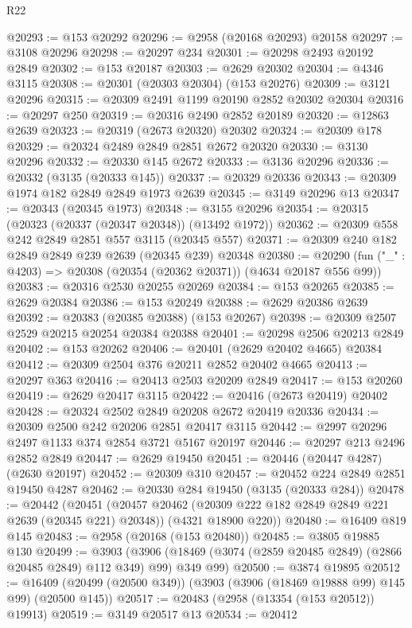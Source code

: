 \begin{lexlean}{R22}
\begin{coremodule}
@20293 := @153 @20292
@20296 := @2958 (@20168 @20293) @20158
@20297 := @3108 @20296
@20298 := @20297 @234
@20301 := @20298 @2493 @20192 @2849
@20302 := @153 @20187
@20303 := @2629 @20302
@20304 := @4346 @3115
@20308 := @20301 (@20303 @20304) (@153 @20276)
@20309 := @3121 @20296
@20315 := @20309 @2491 @1199 @20190 @2852 @20302 @20304
@20316 := @20297 @250
@20319 := @20316 @2490 @2852 @20189
@20320 := @12863 @2639
@20323 := @20319 (@2673 @20320) @20302
@20324 := @20309 @178
@20329 := @20324 @2489 @2849 @2851 @2672 @20320
@20330 := @3130 @20296
@20332 := @20330 @145 @2672
@20333 := @3136 @20296
@20336 := @20332 (@3135 (@20333 @145))
@20337 := @20329 @20336
@20343 := @20309 @1974 @182 @2849 @2849 @1973 @2639
@20345 := @3149 @20296 @13
@20347 := @20343 (@20345 @1973)
@20348 := @3155 @20296
@20354 := @20315 (@20323 (@20337 (@20347 @20348)) (@13492 @1972))
@20362 := @20309 @558 @242 @2849 @2851 @557 @3115 (@20345 @557)
@20371 := @20309 @240 @182 @2849 @2849 @239 @2639 (@20345 @239) @20348
@20380 := @20290 (fun ("_" : @4203) => @20308 (@20354 (@20362 @20371)) (@4634 @20187 @556 @99))
@20383 := @20316 @2530 @20255 @20269
@20384 := @153 @20265
@20385 := @2629 @20384
@20386 := @153 @20249
@20388 := @2629 @20386 @2639
@20392 := @20383 (@20385 @20388) (@153 @20267)
@20398 := @20309 @2507 @2529 @20215 @20254 @20384 @20388
@20401 := @20298 @2506 @20213 @2849
@20402 := @153 @20262
@20406 := @20401 (@2629 @20402 @4665) @20384
@20412 := @20309 @2504 @376 @20211 @2852 @20402 @4665
@20413 := @20297 @363
@20416 := @20413 @2503 @20209 @2849
@20417 := @153 @20260
@20419 := @2629 @20417 @3115
@20422 := @20416 (@2673 @20419) @20402
@20428 := @20324 @2502 @2849 @20208 @2672 @20419 @20336
@20434 := @20309 @2500 @242 @20206 @2851 @20417 @3115
@20442 := @2997 @20296 @2497 @1133 @374 @2854 @3721 @5167 @20197
@20446 := @20297 @213 @2496 @2852 @2849
@20447 := @2629 @19450
@20451 := @20446 (@20447 @4287) (@2630 @20197)
@20452 := @20309 @310
@20457 := @20452 @224 @2849 @2851 @19450 @4287
@20462 := @20330 @284 @19450 (@3135 (@20333 @284))
@20478 := @20442
    (@20451
      (@20457 @20462 (@20309 @222 @182 @2849 @2849 @221 @2639 (@20345 @221) @20348))
      (@4321 @18900 @220))
@20480 := @16409 @819 @145
@20483 := @2958 (@20168 (@153 @20480))
@20485 := @3805 @19885 @130
@20499 := @3903
    (@3906 (@18469 (@3074 (@2859 @20485 @2849) (@2866 @20485 @2849) @112 @349) @99) @349 @99)
@20500 := @3874 @19895
@20512 := @16409 (@20499 (@20500 @349)) (@3903 (@3906 (@18469 @19888 @99) @145 @99) (@20500 @145))
@20517 := @20483 (@2958 (@13354 (@153 @20512)) @19913)
@20519 := @3149 @20517 @13
@20534 := @20412

\end{coremodule}
\end{lexlean}
